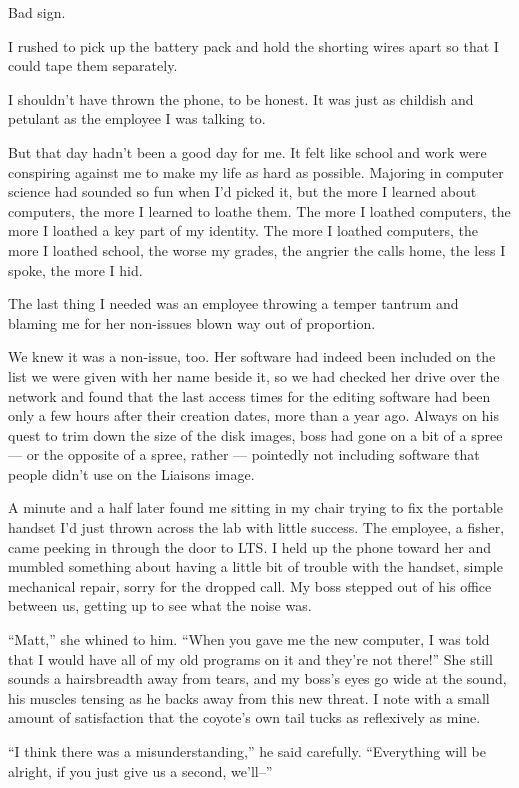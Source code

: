 Bad sign.

I rushed to pick up the battery pack and hold the shorting wires apart so that I could tape them separately.

I shouldn't have thrown the phone, to be honest. It was just as childish and petulant as the employee I was talking to.

But that day hadn't been a good day for me. It felt like school and work were conspiring against me to make my life as hard as possible. Majoring in computer science had sounded so fun when I'd picked it, but the more I learned about computers, the more I learned to loathe them. The more I loathed computers, the more I loathed a key part of my identity. The more I loathed computers, the more I loathed school, the worse my grades, the angrier the calls home, the less I spoke, the more I hid.

The last thing I needed was an employee throwing a temper tantrum and blaming me for her non-issues blown way out of proportion.

We knew it was a non-issue, too. Her software had indeed been included on the list we were given with her name beside it, so we had checked her drive over the network and found that the last access times for the editing software had been only a few hours after their creation dates, more than a year ago. Always on his quest to trim down the size of the disk images, boss had gone on a bit of a spree --- or the opposite of a spree, rather --- pointedly not including software that people didn't use on the Liaisons image.

A minute and a half later found me sitting in my chair trying to fix the portable handset I'd just thrown across the lab with little success. The employee, a fisher, came peeking in through the door to LTS. I held up the phone toward her and mumbled something about having a little bit of trouble with the handset, simple mechanical repair, sorry for the dropped call. My boss stepped out of his office between us, getting up to see what the noise was.

``Matt,'' she whined to him. ``When you gave me the new computer, I was told that I would have all of my old programs on it and they're not there!'' She still sounds a hairsbreadth away from tears, and my boss's eyes go wide at the sound, his muscles tensing as he backs away from this new threat. I note with a small amount of satisfaction that the coyote's own tail tucks as reflexively as mine.

``I think there was a misunderstanding,'' he said carefully. ``Everything will be alright, if you just give us a second, we'll--''

